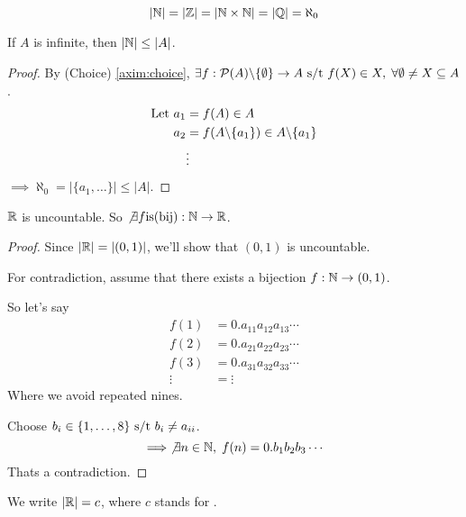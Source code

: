 \documentclass[12pt]{article}
\begin{document}
\bboxex
\[|\mathbb N|=|\mathbb Z|=|\mathbb N\times\mathbb N|=|\mathbb Q|=\aleph_0\]
\ebox


\bbox
\begin{prop}\label{prop:aleph_null_small}
  If \(A\) is infinite, then \(|\mathbb N|\le|A|\).
\end{prop}
\ebox

\bboxproof
\begin{proof}
  By (Choice) \cref{axim:choice}, \(\exists f:\mathcal P(A)\backslash\{\emptyset\}\to
  A\text{ s/t } f(X)\in X,\;\forall\emptyset\neq X\subseteq A\).
  \begin{equation*}
    \begin{split}
      \text{Let }a_1&=f(A)\in A\\
      a_2&=f(A\backslash\{a_1\})\in A\backslash\{a_1\}\\
         &\vdots
    \end{split}
  \end{equation*}
  \(\implies\aleph_0=|\{a_1,\dots\}|\le|A|\).
\end{proof}
\ebox

\bbox
\begin{prop}\label{prop:uncountable_reals}
\(\mathbb R\) is uncountable. So \(\not\exists f\mathrm{is}(\mathrm{bij}):\mathbb N\to\mathbb R\).
\bboxproof
  \begin{proof}  
    Since \(|\mathbb R|=|(0,1)|\), we'll show that \((0,1)\) is uncountable.

    For contradiction, assume that there exists a bijection \(f:\mathbb N\to(0,1)\).

    So let's say
    \begin{equation*}
      \begin{split}
        f(1)&=0.a_{11}a_{12}a_{13}\cdots\\
        f(2)&=0.a_{21}a_{22}a_{23}\cdots\\
        f(3)&=0.a_{31}a_{32}a_{33}\cdots\\
        \vdots&=\vdots
      \end{split}
    \end{equation*}
    Where we avoid repeated nines.

    Choose \(b_i\in\{1,\dots,8\}\text{ s/t } b_i\neq a_{ii}\).
    \[\implies\not\exists n\in\mathbb N,\;f(n)=0.b_1b_2b_3\cdots\]
    Thats a contradiction.
  \end{proof}
\ebox
\end{prop}
\ebox


\bbox
\begin{defn}[Continuum]\label{defn:continuum}
  We write \(|\mathbb R|=c\), where \(c\) stands for .
\end{defn}
\ebox
\end{document}
